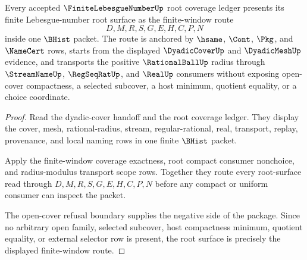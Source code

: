 \begin{theorem}
\label{thm:finite-lebesgue-number-open-phase-root-package}
Every accepted $\FiniteLebesgueNumberUp$ root coverage ledger presents its finite Lebesgue-number root surface as the finite-window route
$$
D,M,R,S,G,E,H,C,P,N
$$
inside one $\BHist$ packet. The route is anchored by $\hsame$, $\Cont$, $\Pkg$, and $\NameCert$ rows, starts from the displayed $\DyadicCoverUp$ and $\DyadicMeshUp$ evidence, and transports the positive $\RationalBallUp$ radius through $\StreamNameUp$, $\RegSeqRatUp$, and $\RealUp$ consumers without exposing open-cover compactness, a selected subcover, a host minimum, quotient equality, or a choice coordinate.
\end{theorem}
\begin{proof}
Read the dyadic-cover handoff and the root coverage ledger. They display the cover, mesh, rational-radius, stream, regular-rational, real, transport, replay, provenance, and local naming rows in one finite $\BHist$ packet.

Apply the finite-window coverage exactness, root compact consumer nonchoice, and radius-modulus transport scope rows. Together they route every root-surface read through $D,M,R,S,G,E,H,C,P,N$ before any compact or uniform consumer can inspect the packet.

The open-cover refusal boundary supplies the negative side of the package. Since no arbitrary open family, selected subcover, host compactness minimum, quotient equality, or external selector row is present, the root surface is precisely the displayed finite-window route.
\end{proof}

